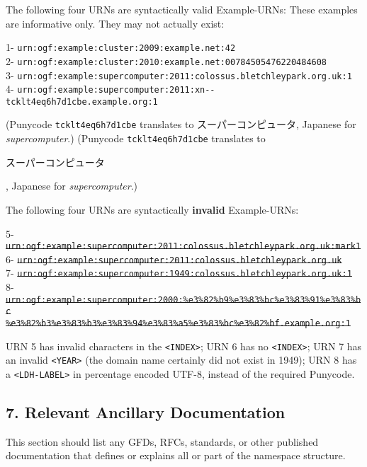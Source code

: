 \documentclass[12pt]{article}  %
\begin{document}
\begin{example}
The following four URNs are syntactically valid Example-URNs:
These examples are informative only. They may not actually exist:

  1- \texttt{urn:ogf:example:cluster:2009:example.net:42} \\
  2- \texttt{urn:ogf:example:cluster:2010:example.net:00784505476220484608} \\
  3- \texttt{urn:ogf:example:supercomputer:2011:colossus.bletchleypark.org.uk:1} \\
  4- \texttt{urn:ogf:example:supercomputer:2011:xn-{}-tcklt4eq6h7d1cbe.example.org:1}

\ifxetex
(Punycode \texttt{tcklt4eq6h7d1cbe} translates to スーパーコンピュータ, Japanese for \emph{supercomputer}.)
\else
(Punycode \texttt{tcklt4eq6h7d1cbe} translates to \begin{CJK}{UTF8}{min}スーパーコンピュータ\end{CJK}, Japanese for \emph{supercomputer}.)
\fi

The following four URNs are syntactically \textbf{invalid} Example-URNs:

  5- \texttt{\st{urn:ogf:example:supercomputer:2011:colossus.bletchleypark.org.uk:mark1}} \\
  6- \texttt{\st{urn:ogf:example:supercomputer:2011:colossus.bletchleypark.org.uk}} \\
  7- \texttt{\st{urn:ogf:example:supercomputer:1949:colossus.bletchleypark.org.uk:1}} \\
  8- \texttt{\st{urn:ogf:example:supercomputer:2000:\%e3\%82\%b9\%e3\%83\%bc\%e3\%83\%91\%e3\%83\%bc} \\
\hspace*{1cm}\st{\%e3\%82\%b3\%e3\%83\%b3\%e3\%83\%94\%e3\%83\%a5\%e3\%83\%bc\%e3\%82\%bf.example.org:1}}

URN 5 has invalid characters in the \texttt{<INDEX>}; URN 6 has no \texttt{<INDEX>}; URN 7 has an invalid \texttt{<YEAR>} (the domain name certainly did not exist in 1949); URN 8 has a \texttt{<LDH-LABEL>} in percentage encoded UTF-8, instead of the required Punycode.
\end{example}

\subsection*{7. Relevant Ancillary Documentation}

This section should list any GFDs, RFCs, standards, or other published
documentation that defines or explains all or part of the
namespace structure.
\end{document}
